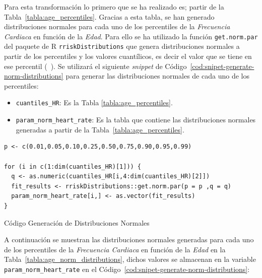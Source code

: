 Para esta transformación lo primero que se ha realizado es; partir de la Tabla~\ref{tabla:age_percentiles}. Gracias a esta tabla, se han generado distribuciones normales para cada uno de los percentiles de la \textit{Frecuencia Cardiaca} en función de la \textit{Edad}. Para ello se ha utilizado la función \texttt{get.norm.par} del paquete de R \texttt{rriskDistributions} que genera distribuciones normales a partir de los percentiles y los valores cuantílicos, es decir el valor que se tiene en ese percentil (~\cite{rriskDistributions}). Se utilizará el siguiente \textit{snippet} de Código~\ref{cod:snipet-generate-norm-distributions} para generar las distribuciones normales de cada uno de los percentiles:

\begin{itemize}
    \item \texttt{cuantiles\_HR}: Es la Tabla \ref{tabla:age_percentiles}.
    \item \texttt{param\_norm\_heart\_rate}: Es la tabla que contiene las distribuciones normales generadas a partir de la Tabla~\ref{tabla:age_percentiles}.
\end{itemize}

\begin{code}[H]
\begin{lstlisting}
p <- c(0.01,0.05,0.10,0.25,0.50,0.75,0.90,0.95,0.99)

for (i in c(1:dim(cuantiles_HR)[1])) {
  q <- as.numeric(cuantiles_HR[i,4:dim(cuantiles_HR)[2]])
  fit_results <- rriskDistributions::get.norm.par(p = p ,q = q)
  param_norm_heart_rate[i,] <- as.vector(fit_results)
}
\end{lstlisting}
\caption{Código Generación de Distribuciones Normales}
\label{cod:snipet-generate-norm-distributions}
\end{code}

A continuación se muestran las distribuciones normales generadas para cada uno de los percentiles de la \textit{Frecuencia Cardiaca} en función de la \textit{Edad} en la Tabla~\ref{tabla:age_norm_distributions}, dichos valores se almacenan en la variable \texttt{param\_norm\_heart\_rate} en el Código~\ref{cod:snipet-generate-norm-distributions}:

